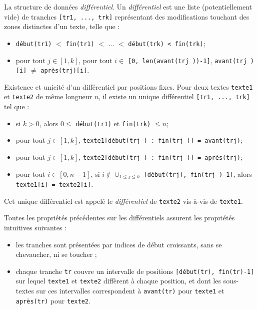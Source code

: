 \begin{defi}{La structure de données \textit{différentiel}}. Un \textit{différentiel} est une liste (potentiellement vide)
de tranches \lstinline{[tr1, ..., trk]} représentant des modifications touchant des zones distinctes d'un
texte, telle que :
\begin{itemize}
\item \lstinline{début(tr1)} $<$ \lstinline{fin(tr1)} $<$ ... $<$ \lstinline{début(trk) < fin(trk)};
\item pour tout $j \in [1, k]$, pour tout $i \in$ \lstinline{[0, len(avant(trj ))-1]}, \lstinline{avant(trj )[i]} $\neq$ \lstinline{après(trj)[i]}.  
\end{itemize}
\end{defi}

\begin{prop}{Existence et unicité d'un différentiel par positions fixes.} Pour deux textes \lstinline{texte1} et
\lstinline{texte2} de même longueur $n$, il existe un unique différentiel \lstinline{[tr1, ..., trk]} tel que :
\begin{itemize}
\item si $k > 0$, alors $0 \leq$ \lstinline{début(tr1)} et \lstinline{fin(trk)} $\leq n $;
\item pour tout $j \in [1, k]$, \lstinline{texte1[début(trj ) : fin(trj )] = avant(trj)};
\item pour tout $j \in [1, k]$, \lstinline{texte2[début(trj ) : fin(trj )] = après(trj)};
\item pour tout $i \in [0, n-1]$, si $i \notin \cup_{1\leq j \leq k}$
\lstinline{[début(trj), fin(trj )-1]}, alors \lstinline{texte1[i] = texte2[i]}.
\end{itemize}
\end{prop}

Cet unique différentiel est appelé le \textit{différentiel} de \lstinline{texte2} vis-à-vis de \lstinline{texte1}.

Toutes les propriétés précédentes sur les différentiels assurent les propriétés intuitives suivantes :
\begin{itemize}
\item les tranches sont présentées par indices de début croissants, sans se chevaucher, ni se toucher ;
\item chaque tranche \lstinline{tr} couvre un intervalle de positions \lstinline{[début(tr), fin(tr)-1]} sur lequel 
\lstinline{texte1} et \lstinline{texte2} diffèrent à chaque position, et dont les sous-textes sur ces intervalles
correspondent à \lstinline{avant(tr)} pour \lstinline{texte1} et \lstinline{après(tr)} pour \lstinline{texte2}.
\end{itemize}


